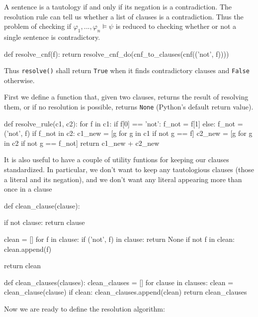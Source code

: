 \documentclass[a4paper,notitlepage]{scrartcl}
\let\phi\varphi
\begin{document}
A sentence is a tautology if and only if its negation is a contradiction.
The resolution rule can tell us whether a list of clauses is a contradiction.
Thus the problem of checking if $\phi_1,...,\phi_n\models\psi$ is reduced
   to checking whether or not a single sentence is contradictory.

\begin{code}
def resolve_cnf(f):
    return resolve_cnf_do(cnf_to_clauses(cnf(('not', f))))
\end{code}

Thus \texttt{resolve()} shall return \texttt{True} when it finds 
   contradictory clauses and \texttt{False} otherwise.

First we define a function that, given two clauses, returns the result
   of resolving them, or if no resolution is possible, returns 
   \texttt{None} (Python's default return value).

\begin{code}

def resolve_rule(c1, c2):
    for f in c1:
        if f[0] == 'not':
            f_not = f[1]
        else:
            f_not = ('not', f)
        if f_not in c2:
            c1_new = [g for g in c1 if not g == f]
            c2_new = [g for g in c2 if not g == f_not] 
            return c1_new + c2_new
\end{code}

It is also useful to have a couple of utility funtions for keeping our
   clauses standardized.
In particular, we don't want to keep any tautologious clauses (those
   a literal and its negation), and we don't want any literal
   appearing more than once in a clause

\begin{code}

def clean_clause(clause):

    if not clause:
        return clause

    clean = []
    for f in clause:
        if ('not', f) in clause:
            return None
        if not f in clean:
            clean.append(f)

    return clean


def clean_clauses(clauses):
    clean_clauses = []
    for clause in clauses:
        clean = clean_clause(clause)
        if clean:
            clean_clauses.append(clean)
    return clean_clauses

\end{code}

Now we are ready to define the resolution algorithm:
\end{document}
